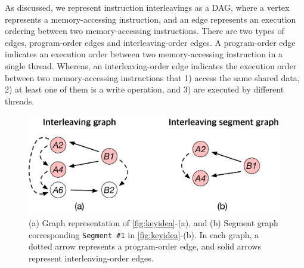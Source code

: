 %




As discussed,
we represent instruction interleavings as a DAG, where
%
a vertex represents a memory-accessing instruction, and an edge
represents an execution ordering between two memory-accessing
instructions. There are two types of edges,
program-order edges and interleaving-order edges.
%
A program-order edge indicates an execution order between two
memory-accessing instruction in a single thread.  Whereas, an
interleaving-order edge indicates the execution order between two
memory-accessing instructions that 1) access the same shared data, 2)
at least one of them is a write operation, and 3) are executed by
different threads.

\begin{figure}[t]
  \centering
  \includegraphics[width=0.8\linewidth]{fig/interleavingsegmentgraph.pdf}
  \caption{(a) Graph representation of \autoref{fig:keyidea}-(a), and
    (b) Segment graph corresponding \texttt{Segment \#1} in
    \autoref{fig:keyidea}-(b). In each graph, a dotted arrow
    represents a program-order edge, and solid arrows represent
    interleaving-order edges.}
  \label{fig:interleavingsegmentgraph}
\end{figure}

%



